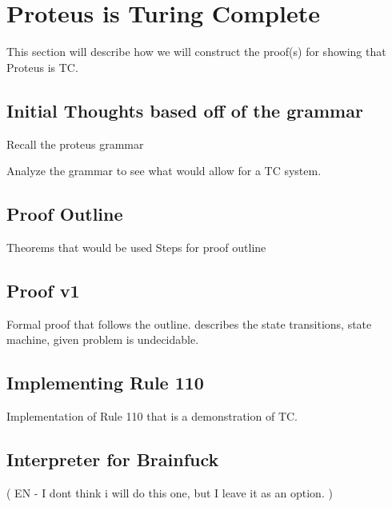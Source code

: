 \chapter{Proteus is Turing Complete}\label{chapter:ProteusTC}

This section will describe how we will construct the proof(s) for showing that Proteus is TC.

\section{Initial Thoughts based off of the grammar}

Recall the proteus grammar

Analyze the grammar to see what would allow for a TC system.

\section{Proof Outline}

Theorems that would be used
Steps for proof outline

\section{Proof v1}

Formal proof that follows the outline.
describes the state transitions, state machine, given problem is undecidable.

\section{Implementing Rule 110}

Implementation of Rule 110 that is a demonstration of TC.

\section{Interpreter for Brainfuck}

(
EN - I dont think i will do this one, but I leave it as an option.
)